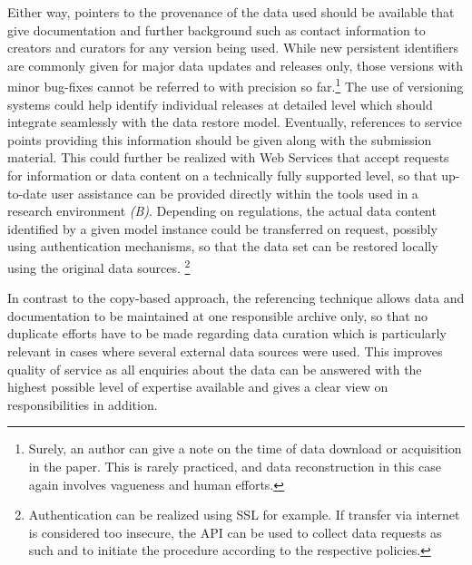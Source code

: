 \documentclass{acm_proc_article-sp}
\begin{document}
Either way, pointers to the provenance of the data used should be available that give documentation and further background such as contact information to creators and curators for any version being used.
While new persistent identifiers are commonly given for major data updates and releases only, those versions with minor bug-fixes cannot be referred to with precision so far.\footnote{Surely, an author can give a note on the time of data download or acquisition in the paper. This is rarely practiced, and data reconstruction in this case again involves vagueness and human efforts.}
The use of versioning systems could help identify individual releases at detailed level \cite{KoenkerZeileis2009} which should integrate seamlessly with the data restore model.
Eventually, references to service points providing this information should be given along with the submission material.
This could further be realized with Web Services that accept requests for information or data content on a technically fully supported level, so that up-to-date user assistance can be provided directly within the tools used in a research environment \textit{(B)}.
Depending on regulations, the actual data content identified by a given model instance could be transferred on request, possibly using authentication mechanisms, so that the data set can be restored locally using the original data sources.
\footnote{Authentication can be realized using SSL for example. If transfer via internet is considered too insecure, the API can be used to collect data requests as such and to initiate the procedure according to the respective policies.}


In contrast to the copy-based approach, the referencing technique allows data and documentation to be maintained at one responsible archive only, so that no duplicate efforts have to be made regarding data curation which is particularly relevant in cases where several external data sources were used.
This improves quality of service as all enquiries about the data can be answered with the highest possible level of expertise available and gives a clear view on responsibilities in addition.
\end{document}
